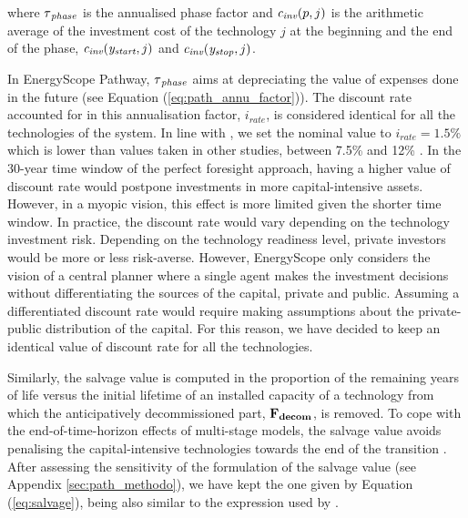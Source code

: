 \noindent where $\tau\textsubscript{\emph{phase}}$ is the annualised phase factor and $\emph{c\textsubscript{inv}}(p,j)$ is the arithmetic average of the investment cost of the technology $j$ at the beginning and the end of the phase, $\emph{c\textsubscript{inv}}(\emph{y\textsubscript{start}},j)$ and $\emph{c\textsubscript{inv}}(\emph{y\textsubscript{stop}},j)$. 

In EnergyScope Pathway, $\tau\textsubscript{\emph{phase}}$ aims at depreciating the value of expenses done in the future (see Equation (\ref{eq:path_annu_factor})). The discount rate accounted for in this annualisation factor, $i_{rate}$, is considered identical for all the technologies of the system. In line with \citet{limpens2021generating}, we set the nominal value to $i_{rate}=1.5\%$ which is lower than values taken in other studies, between 7.5\% and 12\% \cite{meinke2017energy,simoes2013jrc,EuropeanCommission2016}. In the 30-year time window of the perfect foresight approach, having a higher value of discount rate would postpone investments in more capital-intensive assets. However, in a myopic vision, this effect is more limited given the shorter time window. In practice, the discount rate would vary depending on the technology investment risk. Depending on the technology readiness level, private investors would be more or less risk-averse. However, EnergyScope only considers the vision of a central planner where a single agent makes the investment decisions without differentiating the sources of the capital, \ie private and public. Assuming a differentiated discount rate would require making assumptions about the private-public distribution of the capital. For this reason, we have decided to keep an identical value of discount rate for all the technologies.

Similarly, the salvage value is computed in the proportion of the remaining years of life versus the initial lifetime of an installed capacity of a technology from which the anticipatively decommissioned part, $\textbf{F\textsubscript{decom}}$, is removed. To cope with the end-of-time-horizon effects of multi-stage models, the salvage value avoids penalising the capital-intensive technologies towards the end of the transition \cite{poncelet2016myopic}. After assessing the sensitivity of the formulation of the salvage value (see Appendix \ref{sec:path_methodo}), we have kept the one given by Equation (\ref{eq:salvage}), being also similar to the expression used by \citet{prina2019transition}.


